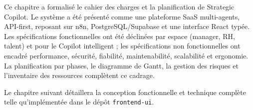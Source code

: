 Ce chapitre a formalisé le cahier des charges et la planification de Strategic Copilot. Le système a été présenté comme une plateforme SaaS multi-agents, API-first, reposant sur n8n, PostgreSQL/Supabase et une interface React typée. Les spécifications fonctionnelles ont été déclinées par espace (manager, RH, talent) et pour le Copilot intelligent ; les spécifications non fonctionnelles ont encadré performance, sécurité, fiabilité, maintenabilité, scalabilité et ergonomie. La planification par phases, le diagramme de Gantt, la gestion des risques et l'inventaire des ressources complètent ce cadrage.

Le chapitre suivant détaillera la conception fonctionnelle et technique complète telle qu'implémentée dans le dépôt \texttt{frontend-ui}.
